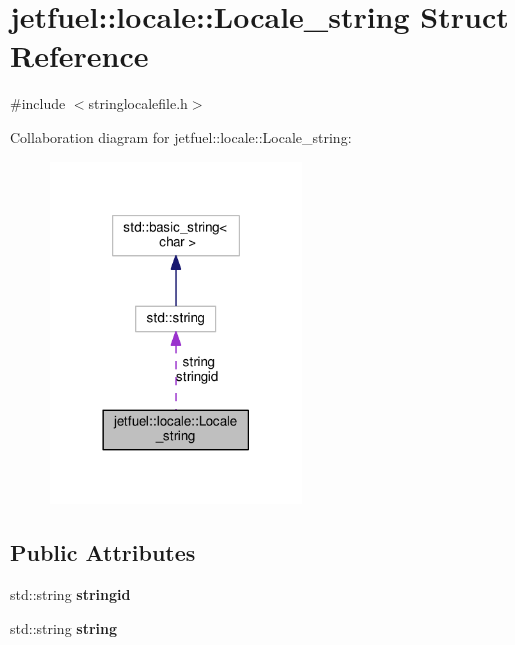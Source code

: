 \hypertarget{structjetfuel_1_1locale_1_1Locale__string}{}\section{jetfuel\+:\+:locale\+:\+:Locale\+\_\+string Struct Reference}
\label{structjetfuel_1_1locale_1_1Locale__string}


{\ttfamily \#include $<$stringlocalefile.\+h$>$}



Collaboration diagram for jetfuel\+:\+:locale\+:\+:Locale\+\_\+string\+:
\nopagebreak
\begin{figure}[H]
\begin{center}
\leavevmode
\includegraphics[width=189pt]{structjetfuel_1_1locale_1_1Locale__string__coll__graph}
\end{center}
\end{figure}
\subsection*{Public Attributes}
\begin{DoxyCompactItemize}
\item 
\mbox{\label{structjetfuel_1_1locale_1_1Locale__string_a7e6246a99dcae8a12968a1fac0dd81cc}} 
std\+::string {\bfseries stringid}
\item 
\mbox{\label{structjetfuel_1_1locale_1_1Locale__string_a9cd781f5676a7a4b66b06559f177eaab}} 
std\+::string {\bfseries string}
\end{DoxyCompactItemize}



